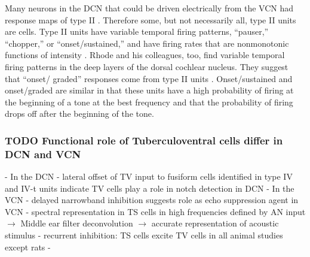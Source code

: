  Many neurons in the DCN that could be driven electrically
 from the VCN had response maps of type II \citep{Young:1980}.
 Therefore some, but not necessarily all, type II units are \TV cells. Type II
 units have variable temporal firing patterns, ``pauser,'' ``chopper,'' or
 ``onset/sustained,'' and have firing rates that are nonmonotonic functions of
 intensity \citep{ShofnerYoung:1985}. Rhode and his colleagues, too, find
 variable temporal firing patterns in the deep layers of the dorsal cochlear
 nucleus. They suggest that ``onset/ graded'' responses come from type II units
 \citep{RhodeGreenberg:1992}. Onset\slash sustained \citep{ShofnerYoung:1985}
 and onset\slash graded \PSTHs \citep{RhodeGreenberg:1992} are similar in that
 these units have a high probability of firing at the beginning of a tone at the
 best frequency and that the probability of firing drops off after the beginning
 of the tone.



\subsubsection{TODO Functional role of Tuberculoventral cells differ in DCN and VCN}

 - In the DCN
  - lateral offset of TV input to fusiform cells identified in \EIRA type IV and IV-t units indicate TV cells play a role in notch detection in DCN
 - In the VCN
  - delayed narrowband inhibition suggests role as echo suppression agent in VCN
  - spectral representation in TS cells in high frequencies defined by AN input $\rightarrow$ Middle ear filter deconvolution $\rightarrow$ accurate representation of acoustic stimulus
  - recurrent inhibition:  TS cells excite TV cells in all animal studies except rats
    - 










